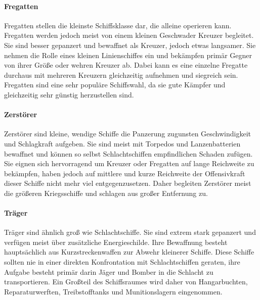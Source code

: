 \documentclass[11pt, a4paper]{article}
\begin{document}
\paragraph{Fregatten}
Fregatten stellen die kleinste Schiffsklasse dar, die alleine operieren kann. Fregatten werden jedoch meist 
von einem kleinen Geschwader Kreuzer begleitet. Sie sind besser gepanzert und bewaffnet als Kreuzer, jedoch 
etwas langsamer. Sie nehmen die Rolle eines kleinen Linienschiffes ein und bekämpfen primär Gegner von ihrer
Größe oder wehren Kreuzer ab. Dabei kann es eine einzelne Fregatte durchaus mit mehreren Kreuzern gleichzeitig
aufnehmen und siegreich sein. Fregatten sind eine sehr populäre Schiffswahl, da sie gute Kämpfer und 
gleichzeitig sehr günstig herzustellen sind.
%
\paragraph{Zerstörer}
Zerstörer sind kleine, wendige Schiffe die Panzerung zugunsten Geschwindigkeit und Schlagkraft aufgeben.
Sie sind meist mit Torpedos und Lanzenbatterien bewaffnet und können so selbst Schlachtschiffen empfindlichen
Schaden zufügen. Sie eignen sich hervorragend um Kreuzer oder Fregatten auf lange Reichweite zu bekämpfen,
haben jedoch auf mittlere und kurze Reichweite der Offensivkraft dieser Schiffe nicht mehr viel 
entgegenzusetzen. Daher begleiten Zerstörer meist die größeren Kriegsschiffe und schlagen aus großer 
Entfernung zu.
%
\paragraph{Träger}
Träger sind ähnlich groß wie Schlachtschiffe. Sie sind extrem stark gepanzert und verfügen meist über 
zusätzliche Energieschilde. Ihre Bewaffnung besteht hauptsächlich aus Kurzstreckenwaffen zur Abwehr kleinerer
Schiffe. Diese Schiffe sollten nie in einer direkten Konfrontation mit Schlachtschiffen geraten, ihre Aufgabe 
besteht primär darin Jäger und Bomber in die Schlacht zu transportieren. Ein Großteil des Schiffsraumes wird 
daher von Hangarbuchten, Reparaturwerften, Treibstofftanks und Munitionslagern eingenommen.
%
\end{document}
